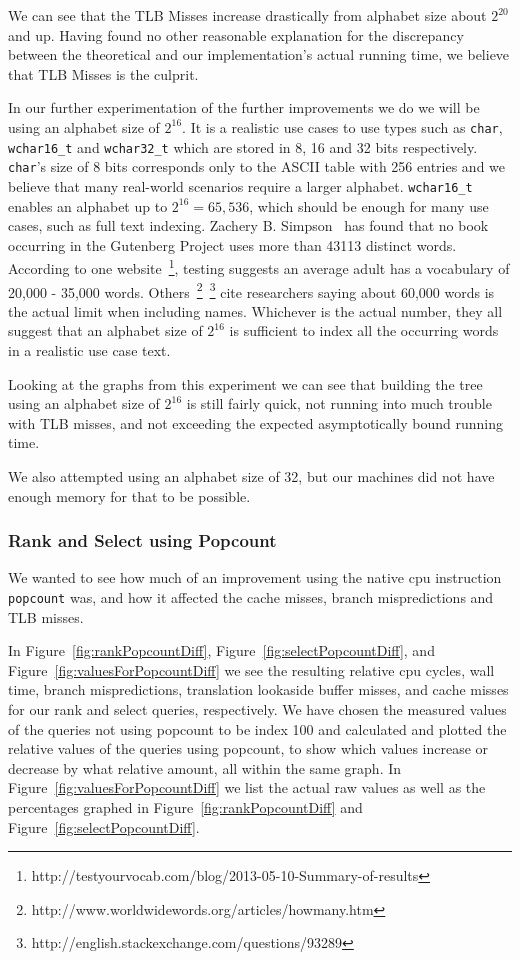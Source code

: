 We can see that the TLB Misses increase drastically from alphabet size about $2^{20}$ and up.
Having found no other reasonable explanation for the discrepancy between the theoretical and our implementation's actual running time, we believe that TLB Misses is the culprit.

In our further experimentation of the further improvements we do we will be using an alphabet size of $2^{16}$.
It is a realistic use cases to use types such as \texttt{char}, \texttt{wchar16\_t} and \texttt{wchar32\_t} which are stored in 8, 16 and 32 bits respectively.
\texttt{char}'s size of 8 bits corresponds only to the ASCII table with 256 entries and we believe that many real-world scenarios require a larger alphabet.
\texttt{wchar16\_t} enables an alphabet up to $2^{16} = 65,536$, which should be enough for many use cases, such as full text indexing.
Zachery B. Simpson~ has found that no book occurring in the Gutenberg Project uses more than 43113 distinct words.
According to one website~\footnote{http://testyourvocab.com/blog/2013-05-10-Summary-of-results}, testing suggests an average adult has a vocabulary of 20,000 - 35,000 words. 
Others~\footnote{http://www.worldwidewords.org/articles/howmany.htm}~\footnote{http://english.stackexchange.com/questions/93289} cite researchers saying about 60,000 words is the actual limit when including names.
Whichever is the actual number, they all suggest that an alphabet size of $2^{16}$ is sufficient to index all the occurring words in a realistic use case text.

Looking at the graphs from this experiment we can see that building the tree using an alphabet size of $2^{16}$ is still fairly quick, not running into much trouble with TLB misses, and not exceeding the expected asymptotically bound running time.

We also attempted using an alphabet size of 32, but our machines did not have enough memory for that to be possible.

\subsubsection{Rank and Select using Popcount}
\label{sec:experimentPopcountRankSelect}
We wanted to see how much of an improvement using the native cpu instruction \texttt{popcount} was, and how it affected the cache misses, branch mispredictions and TLB misses.


In Figure~\ref{fig:rankPopcountDiff}, Figure~\ref{fig:selectPopcountDiff}, and Figure~\ref{fig:valuesForPopcountDiff} we see the resulting relative cpu cycles, wall time, branch mispredictions, translation lookaside buffer misses, and cache misses for our rank and select queries, respectively.
We have chosen the measured values of the queries not using popcount to be index 100 and calculated and plotted the relative values of the queries using popcount, to show which values increase or decrease by what relative amount, all within the same graph.
In Figure~\ref{fig:valuesForPopcountDiff} we list the actual raw values as well as the percentages graphed in Figure~\ref{fig:rankPopcountDiff} and Figure~\ref{fig:selectPopcountDiff}.


